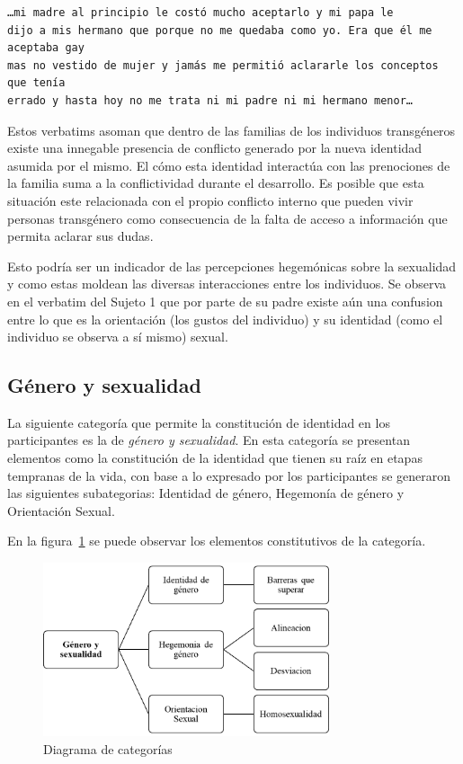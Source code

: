 \begin{verbatim}
…mi madre al principio le costó mucho aceptarlo y mi papa le
dijo a mis hermano que porque no me quedaba como yo. Era que él me aceptaba gay
mas no vestido de mujer y jamás me permitió aclararle los conceptos que tenía
errado y hasta hoy no me trata ni mi padre ni mi hermano menor…
\end{verbatim}

Estos verbatims asoman que dentro de las familias de los individuos transgéneros
existe una innegable presencia de conflicto generado por la nueva identidad
asumida por el mismo. El cómo esta identidad interactúa con las prenociones de
la familia suma a la conflictividad durante el desarrollo. Es posible que esta
situación este relacionada con el propio conflicto interno que pueden vivir
personas transgénero como consecuencia de la falta de acceso a información que
permita aclarar sus dudas.

Esto podría ser un indicador de las percepciones hegemónicas sobre la sexualidad
y como estas moldean las diversas interacciones entre los individuos. Se
observa en el verbatim del Sujeto 1 que por parte de su padre existe aún una
confusion entre lo que es la orientación (los gustos del individuo) y su
identidad (como el individuo se observa a sí mismo) sexual.

\subsection{Género y sexualidad}

La siguiente categoría que permite la constitución de identidad en los
participantes es la de \emph{género y sexualidad}. En esta categoría se
presentan elementos como la constitución de la identidad que tienen su raíz en
etapas tempranas de la vida, con base a lo expresado por los participantes se
generaron las siguientes subategorias: Identidad de género, Hegemonía de género
y Orientación Sexual.

En la figura~\ref{fig:genero} se puede observar los elementos constitutivos de
la categoría.

\begin{figure}
    \centering
    \includegraphics[width=0.75\textwidth]{genero}
    \caption{Diagrama de categorías}\label{fig:genero}
\end{figure}

